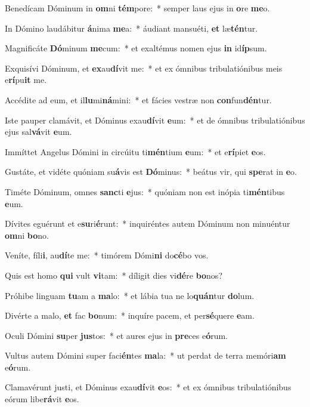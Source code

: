 \item Benedícam Dóminum in \textbf{om}ni \textbf{tém}pore:~* semper laus ejus in \textbf{o}re \textbf{me}o.
\item In Dómino laudábitur \textbf{á}nima \textbf{me}a:~* áudiant mansuéti, \textbf{et} læ\textbf{tén}tur.
\item Magnificáte \textbf{Dó}minum \textbf{me}cum:~* et exaltémus nomen ejus \textbf{in} id\textbf{íp}sum.
\item Exquisívi Dóminum, et \textbf{ex}au\textbf{dí}vit me:~* et ex ómnibus tribulatiónibus meis e\textbf{rí}pu\textbf{it} me.
\item Accédite ad eum, et il\textbf{lu}mi\textbf{ná}mini:~* et fácies vestræ non \textbf{con}fun\textbf{dén}tur.
\item Iste pauper clamávit, et Dóminus exau\textbf{dí}vit \textbf{e}um:~* et de ómnibus tribulatiónibus ejus sal\textbf{vá}vit \textbf{e}um.
\item Immíttet Angelus Dómini in circúitu ti\textbf{mén}tium \textbf{e}um:~* et e\textbf{rí}piet \textbf{e}os.
\item Gustáte, et vidéte quóniam su\textbf{á}vis est \textbf{Dó}minus:~* beátus vir, qui \textbf{spe}rat in \textbf{e}o.
\item Timéte Dóminum, omnes \textbf{sanc}ti \textbf{e}jus:~* quóniam non est inópia ti\textbf{mén}tibus \textbf{e}um.
\item Dívites eguérunt et e\textbf{su}ri\textbf{é}\-runt:~* inquiréntes autem Dóminum non minuéntur \textbf{om}ni \textbf{bo}no.
\item Veníte, fíli\textbf{i}, au\textbf{dí}te me:~* timórem Dómi\textbf{ni} do\textbf{cé}bo vos.
\item Quis est homo \textbf{qui} vult \textbf{vi}tam:~* díligit dies vi\textbf{dé}re \textbf{bo}nos?
\item Próhibe linguam \textbf{tu}am a \textbf{ma}lo:~* et lábia tua ne lo\textbf{quán}tur \textbf{do}lum.
\item Divérte a malo, \textbf{et} fac \textbf{bo}num:~* inquíre pacem, et per\textbf{sé}quere \textbf{e}am.
\item Oculi Dómini \textbf{su}per \textbf{jus}tos:~* et aures ejus in \textbf{pre}ces e\textbf{ó}rum.
\item Vultus autem Dómini super faci\textbf{én}tes \textbf{ma}la:~* ut perdat de terra memóri\textbf{am} e\textbf{ó}rum.
\item Clamavérunt justi, et Dóminus exau\textbf{dí}vit \textbf{e}os:~* et ex ómnibus tribulatiónibus eórum libe\textbf{rá}vit \textbf{e}os.
